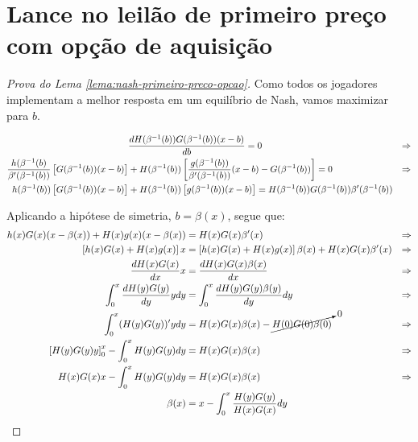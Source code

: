 \section{Lance no leilão de primeiro preço com opção de aquisição}
\begin{proof}[Prova do Lema \ref{lema:nash-primeiro-preco-opcao}]
	Como todos os jogadores implementam a melhor resposta em um equilíbrio de Nash, vamos maximizar para $b$.
	
	\begin{align*}
		& \frac{d H(\beta^{-1}(b)) G(\beta^{-1}(b)) (x - b)}{db} = 0 & \Rightarrow \\
		\frac { h(\beta^{-1}(b)}{\beta'(\beta^{-1}(b))} \left[ G(\beta^{-1}(b))(x - b) \right] & + H(\beta^{-1}(b)) \left[ \frac{g(\beta^{-1}(b))}{\beta'(\beta^{-1}(b))}(x - b) - G(\beta^{-1}(b)) \right] = 0 & \Rightarrow \\
		h(\beta^{-1}(b)) \left[ G(\beta^{-1}(b))(x - b) \right] & + H(\beta^{-1}(b)) \left[ g(\beta^{-1}(b))(x - b) \right] = H(\beta^{-1}(b))G(\beta^{-1}(b))\beta'(\beta^{-1}(b))
	\end{align*}

	Aplicando a hipótese de simetria, $b = \beta(x)$, segue que:
	\begin{align*}
		h(x)G(x)(x-\beta(x)) + H(x)g(x)(x-\beta(x)) & = H(x)G(x)\beta'(x) & \Rightarrow \\
		\left[ h(x)G(x) + H(x)g(x) \right]x & = \left[ h(x)G(x) + H(x)g(x) \right]\beta(x) + H(x)G(x)\beta'(x) & \Rightarrow \\
		\frac {d H(x)G(x) }{dx} x & = \frac{d H(x)G(x)\beta(x)}{dx} & \Rightarrow \\
		\int_0^x \frac {d H(y)G(y) }{dy} ydy & = \int_0^x \frac{d H(y)G(y)\beta(y)}{dy}dy & \Rightarrow \\
    	\int_0^x (H(y)G(y))'ydy & = H(x)G(x)\beta(x) - \cancelto{0}{H(0)G(0)\beta(0)} & \Rightarrow \\
    	\left[ H(y)G(y)y \right]_0^x - \int_0^x H(y)G(y)dy & = H(x)G(x)\beta(x) & \Rightarrow \\
    	H(x)G(x)x - \int_0^x H(y)G(y)dy & = H(x)G(x)\beta(x) & \Rightarrow \\
    	\beta(x) & = x - \int_0^x \frac{H(y)G(y)}{H(x)G(x)}dy
	\end{align*}

\end{proof}